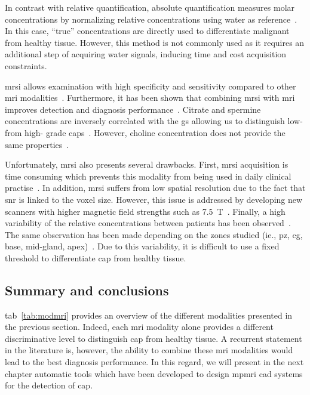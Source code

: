 In contrast with relative quantification, absolute quantification measures
molar concentrations by normalizing relative concentrations using water as
reference~\cite{Lemaitre2011}.
In this case, ``true'' concentrations are directly used to differentiate
malignant from healthy tissue.
However, this method is not commonly used as it requires an additional step of
acquiring water signals, inducing time and cost acquisition constraints.

\ac{mrsi} allows examination with high specificity and sensitivity compared to
other \ac{mri} modalities~\cite{Choi2007}.
Furthermore, it has been shown that combining \ac{mrsi} with \ac{mri} improves
detection and diagnosis
performance~\cite{Scheidler1999a,Kaji1998,Vilanova2009}.
Citrate and spermine concentrations are inversely correlated with the \ac{gs}
allowing us to distinguish low- from high- grade
\acp{cap}~\cite{Giskeodegard2013}.
However, choline concentration does not provide the same
properties~\cite{Giskeodegard2013}.

Unfortunately, \ac{mrsi} also presents several drawbacks.
First, \ac{mrsi} acquisition is time consuming which prevents this modality
from being used in daily clinical practise~\cite{Barentsz2012}.
In addition, \ac{mrsi} suffers from low spatial resolution due to the fact that
\ac{snr} is linked to the voxel size.
However, this issue is addressed by developing new scanners with higher
magnetic field strengths such as \SI{7.5}{\tesla}~\cite{Giskeodegard2013}.
Finally, a high variability of the relative concentrations between patients has
been observed~\cite{Choi2007}.
The same observation has been made depending on the zones studied (ie.,
\ac{pz}, \ac{cg}, base, mid-gland, apex)~\cite{Walker2010,Lemaitre2011}.
Due to this variability, it is difficult to use a fixed threshold to
differentiate \ac{cap} from healthy tissue.

\subsection{Summary and conclusions}

\acs{tab}~\ref{tab:modmri} provides an overview of the different modalities
presented in the previous section.
Indeed, each \ac{mri} modality alone provides a different discriminative level
to distinguish \ac{cap} from healthy tissue.
A recurrent statement in the literature is, however, the ability to combine
these \ac{mri} modalities would lead to the best diagnosis performance.
In this regard, we will present in the next chapter automatic tools which have
been developed to design \ac{mpmri} \ac{cad} systems for the detection of
\ac{cap}.


